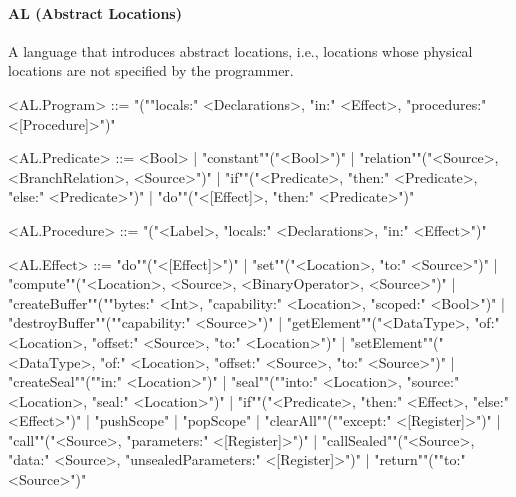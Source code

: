 \documentclass[main.tex]{subfiles}
\begin{document}
\paragraph{ AL (Abstract Locations) } A language that introduces abstract locations, i.e., locations whose physical locations are not specified by the programmer.
\begin{grammar}
	\footnotesize
				<AL.Program> ::=
							"(""locals:" <Declarations>, "in:" <Effect>, "procedures:" <[Procedure]>")"
				\par
				<AL.Predicate> ::=
						<Bool> |
						"constant""("<Bool>")"
						| "relation""("<Source>, <BranchRelation>, <Source>")"
						| "if""("<Predicate>, "then:" <Predicate>, "else:" <Predicate>")"
						| "do""("<[Effect]>, "then:" <Predicate>")"
				\par
				<AL.Procedure> ::=
							"("<Label>, "locals:" <Declarations>, "in:" <Effect>")"
				\par
				<AL.Effect> ::=
						"do""("<[Effect]>")"
						| "set""("<Location>, "to:" <Source>")"
						| "compute""("<Location>, <Source>, <BinaryOperator>, <Source>")"
						| "createBuffer""(""bytes:" <Int>, "capability:" <Location>, "scoped:" <Bool>")"
						| "destroyBuffer""(""capability:" <Source>")"
						| "getElement""("<DataType>, "of:" <Location>, "offset:" <Source>, "to:" <Location>")"
						| "setElement""("<DataType>, "of:" <Location>, "offset:" <Source>, "to:" <Source>")"
						| "createSeal""(""in:" <Location>")"
						| "seal""(""into:" <Location>, "source:" <Location>, "seal:" <Location>")"
						| "if""("<Predicate>, "then:" <Effect>, "else:" <Effect>")"
						| "pushScope"
						| "popScope"
						| "clearAll""(""except:" <[Register]>")"
						| "call""("<Source>, "parameters:" <[Register]>")"
						| "callSealed""("<Source>, "data:" <Source>, "unsealedParameters:" <[Register]>")"
						| "return""(""to:" <Source>")"
				\par
\end{grammar}
\par
\end{document}
